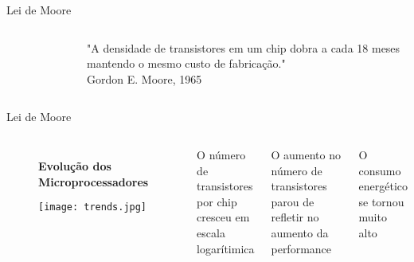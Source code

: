 \begin{frame}[t]{Lei de Moore}
       
          
        \begin{columns}
                \begin{figure}
                \end{figure}
            \LARGE
            "A densidade de transistores em um chip dobra a cada 18 meses mantendo o mesmo custo de fabricação."\\
            Gordon E. Moore, 1965
        \end{columns}
\end{frame}
\begin{frame}[t]{Lei de Moore}
    \begin{columns}
        \begin{figure}
            \centering
            \textbf{Evolução dos Microprocessadores}\par\medskip
            \texttt{[image: trends.jpg]}
        \end{figure}
        \itemize
        \item O número de transistores por chip cresceu em escala logarítimica
        \item O aumento no número de transistores parou de refletir no aumento da performance
        \item O consumo energético se tornou muito alto
    \end{columns}
    
\end{frame}
